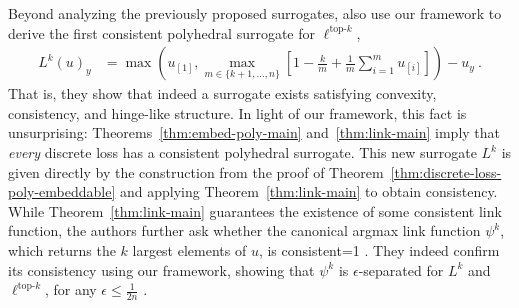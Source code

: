 \documentclass[11pt]{article}
\newcommand{\Comments}{1}
\newcommand{\mytodo}[2]{\ifnum\Comments=1%
  \todo[linecolor=#1!80!black,backgroundcolor=#1,bordercolor=#1!80!black]{#2}\fi}
\newcommand{\jessiet}[1]{\mytodo{teal!20!white}{JF: #1}}
\newcommand{\reals}{\mathbb{R}}
\newcommand{\prop}[1]{\mathrm{prop}[#1]}
\newcommand{\elltopk}{\ell^{\text{top-$k$}}}
\begin{document}
Beyond analyzing the previously proposed surrogates, \citeauthor{finocchiaro2022consistenttopk} also use our framework to derive the first consistent polyhedral surrogate for $\elltopk$,
\begin{align}\label{eq:topk-embedding}
L^k(u)_y &= \max \left(u_{[1]}, \max_{m \in \{k+1, \ldots, n\}} \left[ 1 - \frac k m + \frac 1 m \sum_{i=1}^m u_{[i]}\right] \right)- u_y~.
\end{align}
That is, they show that indeed a surrogate exists satisfying convexity, consistency, and hinge-like structure.
In light of our framework, this fact is unsurprising: Theorems~\ref{thm:embed-poly-main} and~\ref{thm:link-main} imply that \emph{every} discrete loss has a consistent polyhedral surrogate.
This new surrogate $L^k$ is given directly by the construction from the proof of Theorem~\ref{thm:discrete-loss-poly-embeddable} and applying Theorem~\ref{thm:link-main} to obtain consistency.
While Theorem~\ref{thm:link-main} guarantees the existence of some consistent link function, the authors further ask whether the canonical argmax link function $\psi^k$, which returns the $k$ largest elements of $u$, is consistent\jessiet{calibrated?}.
They indeed confirm its consistency using our framework, showing that $\psi^k$ is $\epsilon$-separated for $L^k$ and $\elltopk$, for any $\epsilon \leq \frac 1 {2n}$ \citep[Theorem 4.4]{finocchiaro2022consistenttopk}.


\end{document}
